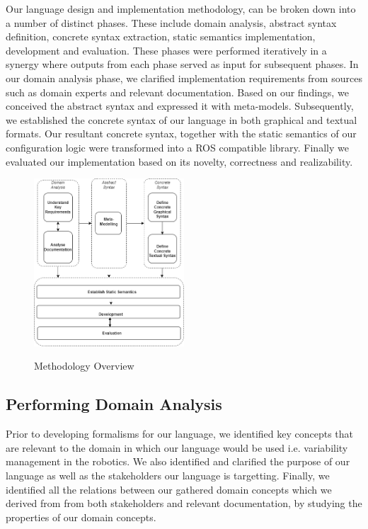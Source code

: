 \documentclass[conference]{IEEEtran}
\begin{document}
Our language design and implementation methodology, can be broken down into a number of distinct phases. These include domain analysis, abstract syntax definition, concrete syntax extraction, static semantics implementation, development and evaluation. These phases were performed iteratively in a synergy where outputs from each phase served as input for subsequent phases. In our domain analysis phase, we clarified implementation requirements from sources such as domain experts and relevant documentation. Based on our findings, we conceived the abstract syntax and expressed it with meta-models. Subsequently, we established the concrete syntax of our language in both graphical and textual formats. Our resultant concrete syntax, together with the static semantics of our configuration logic were transformed into a ROS compatible library. Finally we evaluated our implementation based on its novelty, correctness and realizability.

\begin{figure}[H]
\caption{Methodology Overview}
\centering
\includegraphics[width=0.5\textwidth]{diagrams/methods.png}
\label{methover}
\end{figure}

\subsection{Performing Domain Analysis}
Prior to developing formalisms for our language, we identified key concepts that are relevant to the domain in which our language would be used i.e. variability management in the robotics. We also identified and clarified the purpose of our language as well as the stakeholders our language is targetting. Finally, we identified all the relations between our gathered domain concepts which we derived from  from both stakeholders and relevant documentation, by studying the properties of our domain concepts.
\end{document}

